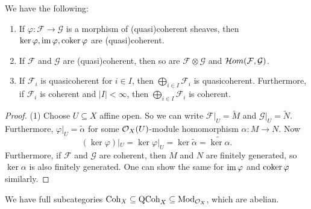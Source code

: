 \begin{prop}
  We have the following:
  \begin{enumerate}
    \item If $\varphi : \mathcal{F} \to \mathcal{G}$
      is a morphism of
      (quasi)coherent sheaves, then
      $\ker \varphi,
      \operatorname{im} \varphi,
      \operatorname{coker} \varphi$
      are (quasi)coherent.
    \item If $\mathcal{F}$ and
      $\mathcal{G}$ are
      (quasi)coherent, then so
      are $\mathcal{F} \otimes \mathcal{G}$
      and $\mathcal{H}om(\mathcal{F}, \mathcal{G})$.
    \item If $\mathcal{F}_i$ is
      quasicoherent for
      $i \in I$, then
      $\bigoplus_{i \in I} \mathcal{F}_i$
      is quasicoherent.
      Furthermore, if $\mathcal{F}_i$
      is coherent and $|I| < \infty$,
      then $\bigoplus_{i \in I} \mathcal{F}_i$
      is coherent.
  \end{enumerate}
\end{prop}

\begin{proof}
  (1) Choose $U \subseteq X$ affine
  open. So we can write
  $\mathcal{F}|_U = \widetilde{M}$
  and $\mathcal{G}|_U = \widetilde{N}$.
  Furthermore, $\varphi|_U = \widetilde{\alpha}$
  for some $\mathcal{O}_X(U)$-module
  homomorphism $\alpha : M \to N$.
  Now
  \[
    (\ker \varphi)|_U
    = \ker \varphi|_U
    = \ker \widetilde{\alpha}
    = \widetilde{\ker \alpha}.
  \]
  Furthermore, if $\mathcal{F}$ and
  $\mathcal{G}$ are coherent, then
  $M$ and $N$ are finitely generated,
  so $\ker \alpha$ is also
  finitely generated.
  One can show the same for
  $\operatorname{im} \varphi$ and
  $\operatorname{coker} \varphi$ similarly.
\end{proof}

\begin{remark}
  We have full subcategories
  $\mathrm{Coh}_X \subseteq \mathrm{QCoh}_X \subseteq \mathrm{Mod}_{\mathcal{O}_X}$,
  which are abelian.
\end{remark}
